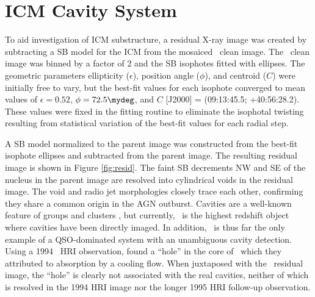 \documentclass[useAMS,usenatbib]{mn2e}
\begin{document}
\section{ICM Cavity System}
\label{sec:cavs}

To aid investigation of ICM substructure, a residual X-ray image was
created by subtracting a SB model for the ICM from the mosaiced
\chandra\ clean image. The \chandra\ clean image was binned by a
factor of 2 and the SB isophotes fitted with ellipses. The geometric
parameters ellipticity ($\epsilon$), position angle ($\phi$), and
centroid ($C$) were initially free to vary, but the best-fit values
for each isophote converged to mean values of $\epsilon = 0.52$, $\phi
= 72.5\mydeg$, and $C$ [J2000] = (09:13:45.5; +40:56:28.2). These
values were fixed in the fitting routine to eliminate the isophotal
twisting resulting from statistical variation of the best-fit values
for each radial step.

A SB model normalized to the parent image was constructed from the
best-fit isophote ellipses and subtracted from the parent image. The
resulting residual image is shown in Figure \ref{fig:resid}. The faint
SB decrements NW and SE of the nucleus in the parent image are
resolved into cylindrical voids in the residual image. The void and
radio jet morphologies closely trace each other, confirming they share
a common origin in the AGN outburst. Cavities are a well-known feature
of groups and clusters \citep[\eg][]{birzan04, 2005MNRAS.364.1343D},
but currently, \irs\ is the highest redshift object where cavities
have been directly imaged. In addition, \irs\ is thus far the only
example of a QSO-dominated system with an unambiguous cavity
detection. Using a 1994 \rosat\ HRI observation,
\citet{1995MNRAS.274L..63F} found a ``hole'' in the core of
\rxj\ which they attributed to absorption by a cooling flow. When
juxtaposed with the \chandra\ residual image, the ``hole'' is clearly
not associated with the real cavities, neither of which is resolved in
the 1994 HRI image nor the longer 1995 HRI follow-up observation.
\end{document}
